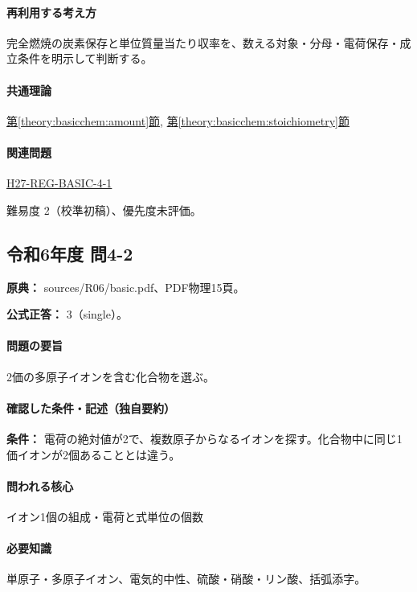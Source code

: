 \paragraph{再利用する考え方} 完全燃焼の炭素保存と単位質量当たり収率を、数える対象・分母・電荷保存・成立条件を明示して判断する。

\paragraph{共通理論} \hyperref[theory:basicchem:amount]{第\ref*{theory:basicchem:amount}節}, \hyperref[theory:basicchem:stoichiometry]{第\ref*{theory:basicchem:stoichiometry}節}

\paragraph{関連問題} \hyperref[q:h27-reg-basic-4-1]{H27-REG-BASIC-4-1}

\par 難易度 2（校準初稿）、優先度未評価。

\subsection{令和6年度 問4-2}
\label{q:r06-reg-basic-4-2}

\noindent\textbf{原典：} sources/R06/basic.pdf、PDF物理15頁。

\textbf{公式正答：} 3（single）。

\paragraph{問題の要旨} 2価の多原子イオンを含む化合物を選ぶ。

\paragraph{確認した条件・記述（独自要約）}\mbox{}\par

\noindent\textbf{条件：} 電荷の絶対値が2で、複数原子からなるイオンを探す。化合物中に同じ1価イオンが2個あることとは違う。\par

\paragraph{問われる核心} イオン1個の組成・電荷と式単位の個数

\paragraph{必要知識} 単原子・多原子イオン、電気的中性、硫酸・硝酸・リン酸、括弧添字。


